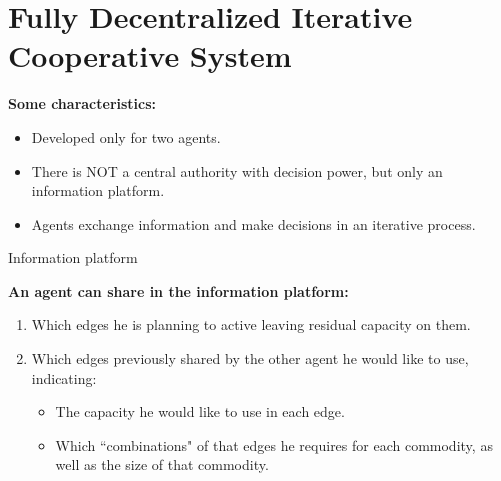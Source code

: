 \documentclass[aspectratio=169]{beamer}
\begin{document}
%
%

\section{Fully Decentralized Iterative Cooperative System}

\begin{frame}{\secname}
\textbf{Some characteristics:}

\begin{itemize}
\setlength\itemsep{1em}
\item Developed \alert{only for two agents}.
\item There is NOT a central authority with decision power, but only an information platform.
\item Agents exchange information and make decisions in an iterative process.
\end{itemize}

\end{frame}

\begin{frame}{Information platform}

\textbf{An agent can share in the information platform:}

\begin{enumerate}
\setlength\itemsep{1em}
\item Which edges he is planning to active leaving residual capacity on them.
\item Which edges previously shared by the other agent he would like to use, indicating:

\begin{itemize}
\setlength\itemsep{1em}
\item The capacity he would like to use in each edge.
\item Which ``combinations" of that edges he requires for each commodity, as well as the size of that commodity.
\end{itemize}
\end{enumerate}
\end{frame}
\end{document}
